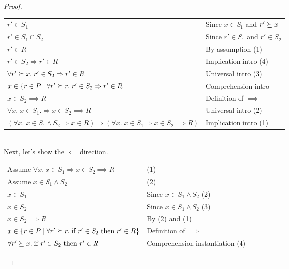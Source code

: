 \begin{proof}
\begin{tabular}{ll}
$r' \in S_1$ & 
Since $x \in S_1$ and $r' \succeq x$ \\

$r' \in S_1 \cap S_2$ & 
Since $r' \in S_1$ and $r' \in S_2$ \\

$r' \in R$ &
By assumption (1) \\

$r' \in S_2 \Rightarrow r' \in R$ &
Implication intro (4) \\

$\forall r' \succeq x.\; r' \in S_2 \Rightarrow r' \in R$ &
Universal intro (3) \\

$x \in \{ r \in P \;|\; \forall r' \succeq r.\; r' \in S_2 \Rightarrow r' \in R$ &
Comprehension intro \\

$x \in S_2 \implies R$ &
Definition of $\implies$ \\

$\forall x.\; x \in S_1. \Rightarrow x \in S_2 \implies R$ &
Universal intro (2) \\

$(\forall x.\; x \in S_1 \land S_2 \Rightarrow x \in R) \Rightarrow (\forall x.\; x \in S_1 \Rightarrow x \in S_2 \implies R)$ &
Implication intro (1) \\
\end{tabular}
\\

Next, let's show the $\Leftarrow$ direction. 
\\

\begin{tabular}{ll}
Assume $\forall x.\; x \in S_1 \Rightarrow x \in S_2 \implies R$ &
(1) \\

Assume $x \in S_1 \land S_2$ & 
(2) \\

$x \in S_1$ & 
Since $x \in S_1 \land S_2$ (2)\\

$x \in S_2$ & 
Since $x \in S_1 \land S_2$ (3) \\

$x \in S_2 \implies R$ & 
By (2) and (1) \\

$x \in \{ r \in P \;|\; \forall r' \succeq r.\; \mbox{if } r' \in S_2 \mbox{ then } r' \in R \}$ &
Definition of $\implies$ \\

$\forall r' \succeq x.\; \mbox{if } r' \in S_2 \mbox{ then } r' \in R$ &
Comprehension instantiation (4) \\


\end{tabular}
\end{proof}
